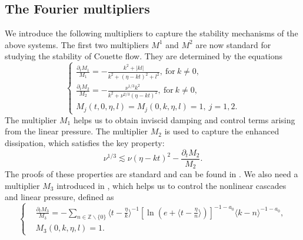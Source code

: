 \documentclass[12pt]{article}
\numberwithin{equation}{section}
\begin{document}
    \subsection{The Fourier multipliers}
	We introduce the following multipliers to capture the stability mechanisms of the above systems. The first two multipliers $M^1$ and $M^2$ are now standard for studying the stability of Couette flow. They are determined by the equations
	\begin{equation*}
		\left\{\begin{array}{l}
			\displaystyle\frac{\partial_tM_1}{M_1}=-\frac{k^2+|kl|}{k^2+(\eta-kt)^2+l^2},\ \mathrm{for}\ k\neq0,\\
			\displaystyle\frac{\partial_tM_2}{M_2}=-\frac{\nu^{1/3}k^2}{k^2+\nu^{2/3}(\eta-kt)^2},\ \mathrm{for}\ k\neq0,\\
			M_j(t,0,\eta,l)=M_j(0,k,\eta,l)=1,\ j=1,2.
		\end{array}\right.
	\end{equation*}
	The multiplier $M_1$ helps us to obtain inviscid damping and control terms arising from the linear pressure. The multiplier $M_2$ is used to capture the enhanced dissipation, which satisfies the key property:
	\begin{equation}\label{prom3}
		\nu^{1/3}\lesssim\nu(\eta-kt)^2-\frac{\partial_tM_2}{M_2}.
	\end{equation}
	The proofs of these properties are standard and can be found in \cite{BGM17}. 
	We also need a multiplier $M_3$ introduced in \cite{LSWZ25}, which helps us to control the nonlinear cascades and linear pressure, defined as
    \begin{equation*}
		\left\{
		\begin{aligned}
			&\frac{\partial_tM_3}{M_3}=-\sum_{n\in\mathbb{Z}\backslash\{0\}}\langle t-\frac{\eta}{k}\rangle^{-1}[\ln(e+\langle t-\frac{\eta}{n}\rangle )]^{-1-a_0}\langle k-n\rangle^{-1-a_0},\\
			&M_3(0,k,\eta,l)=1.
		\end{aligned}
		\right.
	\end{equation*}
    \color{blue}
\end{document}
